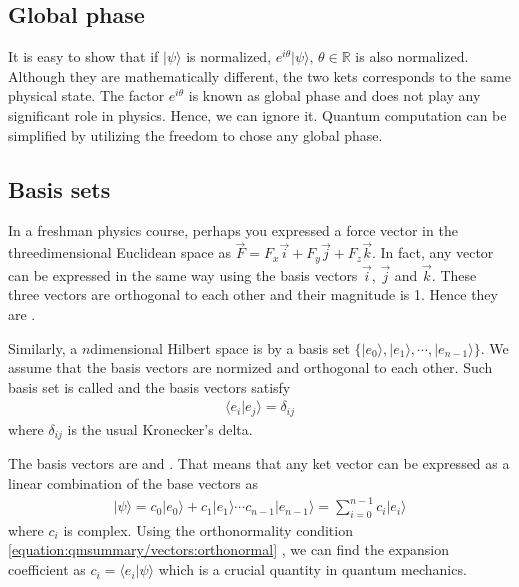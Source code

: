 \documentclass[letterpaper,10pt,english]{jupyterBook}
\begin{document}
\subsection{Global phase}
\label{\detokenize{qmsummary/vectors:global-phase}}
\sphinxAtStartPar
It is easy to show that if \(|\psi\rangle\) is normalized, \(e^{i \theta}|\psi\rangle,\,\theta \in \mathbb{R}\) is also normalized.
Although they are mathematically different, the two kets corresponds to the same physical state.  The factor \(e^{i \theta}\) is known as global phase and does not play any significant role in physics.  Hence, we can ignore it.  Quantum computation can be simplified by utilizing the freedom to chose any global phase.


\subsection{Basis sets}
\label{\detokenize{qmsummary/vectors:basis-sets}}
\sphinxAtStartPar
In a freshman physics course, perhaps you expressed a force vector in the three\sphinxhyphen{}dimensional Euclidean space as \(\vec{F} = F_x \vec{i} + F_y \vec{j} + F_z \vec{k}\).  In fact, any vector can be expressed in the same way using the basis vectors  \(\vec{i}\), \(\vec{j}\) and \(\vec{k}\).  These three vectors are orthogonal to each other and their magnitude is 1.  Hence they are .

\sphinxAtStartPar
Similarly, a \(n\)\sphinxhyphen{}dimensional Hilbert space is  by a basis set \(\{|e_0\rangle, | e_1\rangle, \cdots, |e_{n-1}\rangle\}\).  We assume that the basis vectors are normized and orthogonal to each other.  Such basis set is called  and the basis vectors satisfy
\begin{equation}\label{equation:qmsummary/vectors:orthonormal}
\begin{split}
\langle e_i | e_j \rangle = \delta_{ij}
\end{split}
\end{equation}
\sphinxAtStartPar
where \(\delta_{ij}\) is the usual Kronecker’s delta.

\sphinxAtStartPar
The basis vectors are  and .  That means that any ket vector  can be expressed as a linear combination of the base vectors as
\begin{equation}\label{equation:qmsummary/vectors:basis_expansion}
\begin{split}
|\psi\rangle = c_0 |e_0\rangle + c_1 |e_1\rangle  \cdots c_{n-1} |e_{n-1}\rangle = \sum_{i=0}^{n-1} c_i |e_i\rangle
\end{split}
\end{equation}
\sphinxAtStartPar
where \(c_i\) is complex.
Using the orthonormality condition \eqref{equation:qmsummary/vectors:orthonormal} , we can find the expansion coefficient as \(c_i=\langle  e_i|\psi \rangle\) which is a crucial quantity in quantum mechanics.
\end{document}
